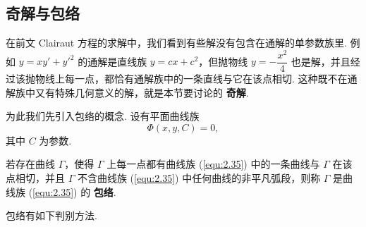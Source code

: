 \subsection{奇解与包络}
在前文 Clairaut 方程的求解中，我们看到有些解没有包含在通解的单参数族里.
例如 $y=xy'+y'^2$ 的通解是直线族 $y=cx+c^2$，但抛物线 $y=-\dfrac{x^2}{4}$
也是解，并且经过该抛物线上每一点，都恰有通解族中的一条直线与它在该点相切.
这种既不在通解族中又有特殊几何意义的解，就是本节要讨论的 \textbf{奇解}.

为此我们先引入包络的概念. 设有平面曲线族
\begin{equation}\label{equ:2.35}
\Phi(x,y,C)=0,
\end{equation}
其中 $C$ 为参数.

\begin{deff}
若存在曲线 $\Gamma$，使得 $\Gamma$ 上每一点都有曲线族 (\ref{equ:2.35})
中的一条曲线与 $\Gamma$ 在该点相切，并且 $\Gamma$ 不含曲线族 (\ref{equ:2.35})
中任何曲线的非平凡弧段，则称 $\Gamma$ 是曲线族 (\ref{equ:2.35}) 的
\textbf{包络}.
\end{deff}

包络有如下判别方法.

